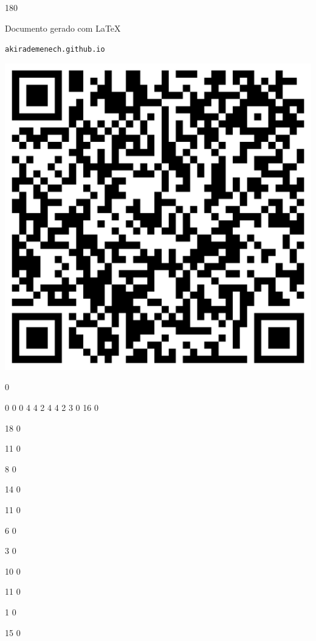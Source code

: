 \documentclass[12pt]{article}
\begin{document}
	\begin{turn}{180}	
		\begin{minipage}{\textwidth}		  
		  Documento gerado com \LaTeX			
		  
		  \texttt{akirademenech.github.io}

		  \includegraphics[height=0.3\textheight]{2e-2.pdf}

		\end{minipage}	
	\end{turn}  
		  
		\vfill  
		  
{
	0	%

	0	%
	0	%
	0	%
	4	%
	4	%
	2	%
	4	%
	4	%
	2	%
	3	%
	0	%
	16	%
	0	%

	18	%
	0	%

	11	%
	0	%

	8	%
	0	%

	14	%
	0	%

	11	%
	0	%

	6	%
	0	%

	3	%
	0	%

	10	%
	0	%

	11	%
	0	%

	1	%
	0	%

	15	%
	0	%

}	  
		    	
\end{document}
